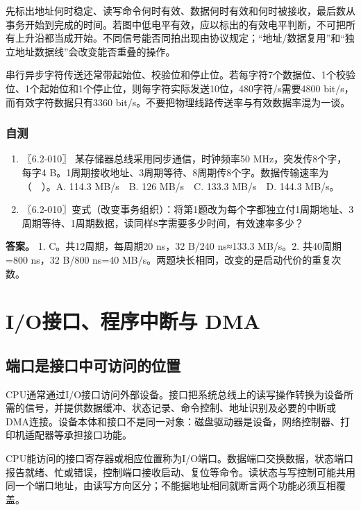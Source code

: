 先标出地址何时稳定、读写命令何时有效、数据何时有效和何时被接收，最后数从事务开始到完成的时间。若图中低电平有效，应以标出的有效电平判断，不可把所有上升沿都当成开始。不同信号能否同拍出现由协议规定；``地址/数据复用''和``独立地址数据线''会改变能否重叠的操作。

串行异步字符传送还常带起始位、校验位和停止位。若每字符7个数据位、1个校验位、1个起始位和1个停止位，则每字符实际发送10位，480字符/s需要4800 bit/s，而有效字符数据只有3360 bit/s。不要把物理线路传送率与有效数据率混为一谈。

\subsection{自测}\label{co-self7}

\begin{enumerate}
\def\labelenumi{\arabic{enumi}.}
\tightlist
\item
  〖6.2-010〗 某存储器总线采用同步通信，时钟频率50 MHz，突发传8个字，每字4 B。1周期接收地址、3周期等待、8周期传8个字。数据传输速率为（　）。A. 114.3 MB/s　B. 126 MB/s　C. 133.3 MB/s　D. 144.3 MB/s。
\item
  〖6.2-010〗变式（改变事务组织）：将第1题改为每个字都独立付1周期地址、3周期等待、1周期数据，读同样8字需要多少时间，有效速率多少？
\end{enumerate}

\textbf{答案。} 1. C。共12周期，每周期20 ns，32 B/240 ns≈133.3 MB/s。2. 共40周期=800 ns，32 B/800 ns=40 MB/s。两题块长相同，改变的是启动代价的重复次数。

\chapter{I/O接口、程序中断与 DMA}\label{co-ch8}

\section{端口是接口中可访问的位置}\label{co-08-01}

CPU通常通过I/O接口访问外部设备。接口把系统总线上的读写操作转换为设备所需的信号，并提供数据缓冲、状态记录、命令控制、地址识别及必要的中断或DMA连接。设备本体和接口不是同一对象：磁盘驱动器是设备，网络控制器、打印机适配器等承担接口功能。

CPU能访问的接口寄存器或相应位置称为I/O端口。数据端口交换数据，状态端口报告就绪、忙或错误，控制端口接收启动、复位等命令。读状态与写控制可能共用同一个端口地址，由读写方向区分；不能据地址相同就断言两个功能必须互相覆盖。

